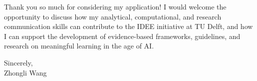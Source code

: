 \documentclass[11pt]{article}
\begin{document}

Thank you so much for considering my application! I would welcome the opportunity to discuss how my analytical, computational, and research communication skills can contribute to the IDEE initiative at TU Delft, and how I can support the development of evidence-based frameworks, guidelines, and research on meaningful learning in the age of AI.

\vspace{5mm}

\noindent Sincerely,\\[15mm]
\noindent Zhongli Wang
\end{document}
